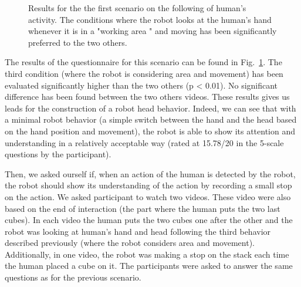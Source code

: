 \documentclass[english,a4paper,11pt,twoside]{StyleThese}
\begin{document}
\begin{figure}[!h]
\centering
    \caption{Results for the the first scenario on the following of human's activity. The conditions where the robot looks at the human's hand whenever it is in a "working area " and moving has been significantly preferred to the two others.}
    \label{fig:resSce2}
\end{figure}

The results of the questionnaire for this scenario can be found in Fig.~\ref{fig:resSce2}. The third condition (where the robot is considering area and movement) has been evaluated significantly higher than the two others (p < 0.01). No significant difference has been found between the two others videos. These results gives us leads for the construction of a robot head behavior. Indeed, we can see that with a minimal robot behavior (a simple switch between the hand and the head based on the hand position and movement), the robot is able to show its attention and understanding in a relatively acceptable way (rated at 15.78/20 in the 5-scale questions by the participant).

Then, we asked ourself if, when an action of the human is detected by the robot, the robot should show its understanding of the action by recording a small stop on the action. We asked participant to watch two videos. These video were also based on the end of interaction (the part where the human puts the two last cubes). In each video the human puts the two cubes one after the other and the robot was looking at human's hand and head following the third behavior described previously (where the robot considers area and movement). Additionally, in one video, the robot was making a stop on the stack each time the human placed a cube on it. The participants were asked to answer the same questions as for the previous scenario.
\end{document}

